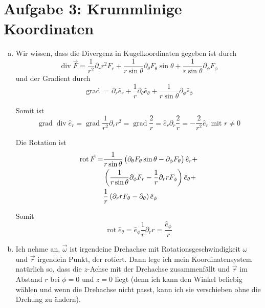 \documentclass[a4paper,german,12pt,smallheadings]{scrartcl}
\begin{document}
\section*{Aufgabe 3: Krummlinige Koordinaten}
\begin{enumerate}[a)]
  \item
    Wir wissen, dass die Divergenz in Kugelkoordinaten gegeben ist durch
    \begin{equation}
      \operatorname{div} \vec{F} = \frac{1}{r^2} \partial_r r^2 F_r + \frac{1}{r \sin \theta} \partial_\theta F_\theta \sin \theta + \frac{1}{r \sin \theta} \partial_\phi F_\phi
    \end{equation}
    und der Gradient durch
    \begin{equation}
      \operatorname{grad} = \partial_r \hat{e}_r + \frac{1}{r} \partial_\theta \hat{e}_\theta + \frac{1}{r \sin \theta} \partial_\phi \hat{e}_\phi
    \end{equation}

    Somit ist
    \begin{equation}
        \operatorname{grad} \operatorname{div} \hat{e}_r
      = \operatorname{grad} \frac{1}{r^2} \partial_r r^2
      = \operatorname{grad} \frac{2}{r}
      = \hat{e}_r \partial_r \frac{2}{r}
      = -\frac{2}{r^2} \hat{e}_r \text{ mit } r \neq 0
    \end{equation}

    Die Rotation ist
    \begin{align}
      \operatorname{rot} \vec{F} =
      &\frac{1}{r \sin \theta} \del{\partial_\theta F_\theta \sin \theta - \partial_\phi F_\theta} \hat{e}_r + \\
      &\del{\frac{1}{r \sin \theta} \partial_\phi F_r - \frac{1}{r} \partial_r r F_\phi} \hat{e}_\theta + \\
      &\frac{1}{r} \del{\partial_r r F_\theta - \partial_\theta} \hat{e}_\phi
    \end{align}

    Somit
    \begin{equation}
      \operatorname{rot} \hat{e}_\theta = \hat{e}_\phi \frac{1}{r} \partial_r r = \frac{\hat{e}_\phi}{r}
    \end{equation}
  \item
    Ich nehme an, $\vec{\omega}$ ist irgendeine Drehachse mit
    Rotationsgeschwindigkeit $\omega$ und $\vec{r}$ irgendein Punkt, der
    rotiert. Dann lege ich mein Koordinatensystem natürlich so, dass die
    $z$-Achse mit der Drehachse zusammenfällt und $\vec{r}$ im Abstand $r$ bei
    $\phi = 0$ und $z=0$ liegt (denn ich kann den Winkel beliebig wählen und
    wenn die Drehachse nicht passt, kann ich sie verschieben ohne die Drehung
    zu ändern).


\end{enumerate}
\end{document}

